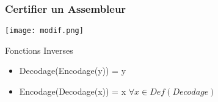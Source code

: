 \documentclass{beamer}
\begin{document}
\begin{frame}
\frametitle{Certifier un Assembleur}

\texttt{[image: modif.png]}

\begin{block}{Fonctions Inverses}
\begin{itemize}
\item Decodage(Encodage(y)) = y
\item Encodage(Decodage(x)) = x  \hspace{2cm} $\forall x \in Def(Decodage)$
\end{itemize}  
\end{block}

\end{frame}
\end{document}
